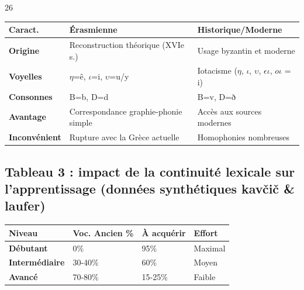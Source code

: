 26

\begin{table}[h!]\small\centering\begin{tabular}{| p{2cm} | p{3cm} | p{3cm} |}\hline\textbf{Caract.} & \textbf{Érasmienne} & \textbf{Historique/Moderne} \\ \hline\textbf{Origine} & Reconstruction théorique (XVIe s.) & Usage byzantin et moderne \\ \hline\textbf{Voyelles} & $\eta$=ê, $\iota$=i, $\upsilon$=u/y & Iotacisme ($\eta$, $\iota$, $\upsilon$, $\epsilon\iota$, $o\iota$ = i) \\ \hline\textbf{Consonnes} & B=b, D=d & B=v, D=ð \\ \hline\textbf{Avantage} & Correspondance graphie-phonie simple & Accès aux sources modernes \\ \hline\textbf{Inconvénient} & Rupture avec la Grèce actuelle & Homophonies nombreuses \\ \hline\end{tabular}\end{table}

\subsection{Tableau 3 : impact de la continuité lexicale sur l'apprentissage (données synthétiques kavčič \& laufer)}

\begin{table}[h!]\small\centering\begin{tabular}{| p{2cm} | p{2.2cm} | p{2cm} | p{2.3cm} |}\hline\textbf{Niveau} & \textbf{Voc. Ancien \%} & \textbf{À acquérir} & \textbf{Effort} \\ \hline\textbf{Débutant} & 0\% & 95\% & Maximal \\ \hline\textbf{Intermédiaire} & 30-40\% & 60\% & Moyen \\ \hline\textbf{Avancé} & 70-80\% & 15-25\% & Faible \\ \hline\end{tabular}\end{table}